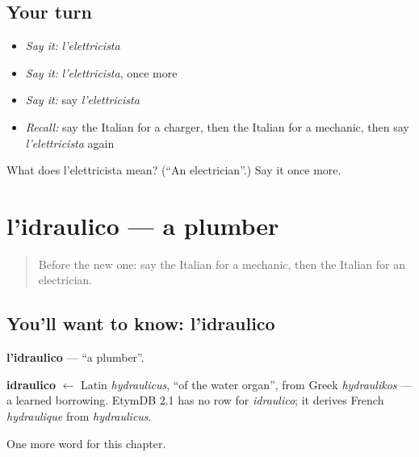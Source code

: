 \subsection*{Your turn}
\begin{itemize}
\raggedright
  \item \emph{Say it:} \emph{l'elettricista}
  \item \emph{Say it:} \emph{l'elettricista}, once more
  \item \emph{Say it:} say \emph{l'elettricista}
  \item \emph{Recall:} say the Italian for a charger, then the Italian for a mechanic, then say \emph{l'elettricista} again
\end{itemize}

\begin{tcolorbox}[breakable,colback=teal!4,colframe=teal!35!black,title={Before you move on}]
What does l'elettricista mean? (\textquotedblleft{}An electrician\textquotedblright{}.) Say it once more.
\end{tcolorbox}
\section[l'idraulico]{l'idraulico — a plumber}

\label{lesson:IT-C163-idraulico}



\begin{quote}
Before the new one: say the Italian for a mechanic, then the Italian for an electrician.
\end{quote}

\subsection*{You'll want to know: l'idraulico}
\textbf{l'idraulico} — \textquotedblleft{}a plumber\textquotedblright{}.

\begin{cousinweb}
\textbf{idraulico} $\leftarrow$ Latin \emph{hydraulicus}, \textquotedblleft{}of the water organ\textquotedblright{}, from Greek \emph{hydraulikos} — a learned borrowing. EtymDB 2.1 has no row for \emph{idraulico}; it derives French \emph{hydraulique} from \emph{hydraulicus}.
\end{cousinweb}

\begin{grammarlens}[title={What you've built}]
One more word for this chapter.
\end{grammarlens}

